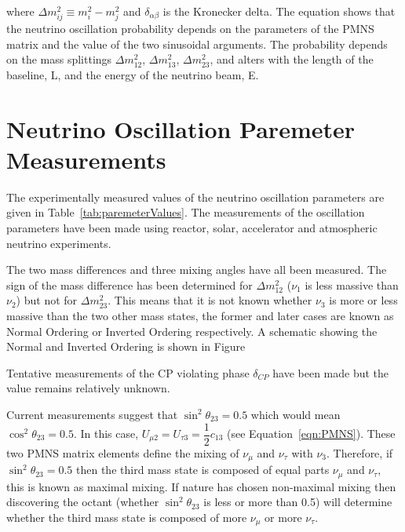 \noindent where $\Delta m^2_{ij} \equiv m^2_i - m^2_j$ and
$\delta_{\alpha \beta}$ is the Kronecker delta. The equation shows
that the neutrino oscillation probability depends on the parameters of
the PMNS matrix and the value of 
the two sinusoidal arguments.
The probability depends on the mass
splittings $\Delta m_{12}^2$,  $\Delta m_{13}^2$,  $\Delta m_{23}^2$,
and alters with the length of the baseline, L, and the energy of the
neutrino beam, E.  

\section{Neutrino Oscillation Paremeter Measurements}

The experimentally measured values of the neutrino oscillation
parameters are given in Table~\ref{tab:paremeterValues}. The
measurements of the oscillation parameters have been made using
reactor, solar, accelerator and atmospheric neutrino
experiments. 

The two mass differences and three mixing angles have all been
measured. The sign of the mass difference has been determined for
$\Delta m^2_{12}$ ($\nu_1$ is less massive than $\nu_2$) but not for
$\Delta m^2_{23}$. This means that it is not known whether $\nu_3$ is
more or less massive than the two other mass states, the former and
later cases are known as Normal Ordering or Inverted Ordering
respectively. A schematic showing the Normal and Inverted Ordering is
shown in Figure

Tentative measurements of the CP violating phase $\delta_{CP}$ have
been made \cite{FA_nue} but the value remains relatively unknown. 

Current measurements suggest that $\sin^2\theta_{23} = 0.5$ which
would mean $\cos^2\theta_{23} = 0.5$. In this case,
$U_{\mu2} = U_{\tau3} = \dfrac{1}{2}c_{13}$ (see
Equation~\ref{eqn:PMNS}). These two PMNS matrix elements define the
mixing of $\nu_{\mu}$ and $\nu_{\tau}$ with $\nu_3$. Therefore, if
$\sin^2\theta_{23} = 0.5$ then the third mass state is composed of
equal parts $\nu_{\mu}$ and $\nu_\tau$, this is known as maximal
mixing. If nature has chosen non-maximal mixing then discovering the
octant (whether $\sin^2\theta_{23}$ is less or more than 0.5) will
determine whether the third mass state is composed of more $\nu_\mu$
or more $\nu_\tau$. 

